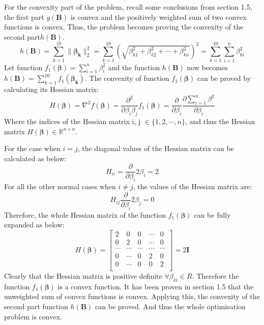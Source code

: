 \documentclass[12pt]{article}
\numberwithin{equation}{section}
\theoremstyle{remark}
\newcommand{\R}{\mathbb R} %
\newcommand{\vect}[1]{\boldsymbol{#1}}
\newcommand{\norm}[2]{\|#1\|_{#2}}
\begin{document}
\medskip
For the convexity part of the problem, recall some conclusions from section 1.5, the first part $g(\vect{B})$ is convex and the positively weighted sum of two convex functions is convex. Thus, the problem becomes proving the convexity of the second part$h(\vect{B})$.
\begin{equation}
h(\vect{B}) = \sum\limits_{k = 1}^{10} \norm{\vect{\beta_k}}{2}^{2} = \sum\limits_{k = 1}^{10} \left(\sqrt{\beta_{k1}^2 + \beta_{k2}^2 + \cdots + \beta_{kn}^2}\right)^{2} = \sum\limits_{k = 1}^{10} \sum\limits_{i=1}^{n} \beta_{ki}^2
\end{equation}
Let function $f_1(\vect{\beta}) = \sum\limits_{i=1}^{n} \beta_{i}^2$ and the function $h(\vect{B})$ now becomes $h(\vect{B}) = \sum\limits_{k = 1}^{10}f_1(\vect{\beta_k})$. The convexity of function $f_1(\vect{\beta})$ can be proved by calculating its Hessian matrix:
\begin{equation}
 H(\vect{\beta}) = \nabla^2f(\vect{\beta}) = \frac{\partial^2}{\partial \beta_{i}\beta_{j}}f_1(\vect{\beta}) = \frac{\partial}{\partial \beta_i}\frac{\partial\sum\limits_{i=1}^{n} \beta^2}{\partial \beta_i}
\end{equation} 
Where the indices of the Hessian matrix i, j $\in \{1, 2, \cdots, n\}$, and thus the Hessian matrix $H(\vect{\beta}) \in \R^{n \times n}$.

\medskip
For the case when $i = j$, the diagonal values of the Hessian matrix can be calculated as below:
\begin{equation}
H_{ii} = \frac{\partial}{\partial\beta_i}2\beta_i = 2
\end{equation}
For all the other normal cases when $i \neq j$, the values of the Hessian matrix are:
\begin{equation}
H_{ij}\frac{\partial}{\partial\beta_i}2\beta_j = 0
\end{equation}
Therefore, the whole Hessian matrix of the function $f_1(\vect{\beta})$ can be fully expanded as below:
$$ H(\vect{\beta}) = 
\begin{bmatrix} 
2 & 0 & 0 & \cdots & 0 \\
0 & 2 & 0 & \cdots & 0 \\
\cdots & \cdots & \cdots & \cdots & \cdots \\
0 & \cdots & 0 & 2 & 0 \\
0 & \cdots & 0 & 0 & 2 \\
\end{bmatrix}
= 2\textbf{I}
$$
Clearly that the Hessian matrix is positive definite $\forall \beta_{ki} \in R$. Therefore the function $ f_1(\vect{\beta})$ is a convex function. It has been proven in section 1.5 that the unweighted sum of convex functions is convex. Applying this, the convexity of the second part function $h(\vect{B})$ can be proved. And thus the whole optimisation problem is convex.
\end{document}
